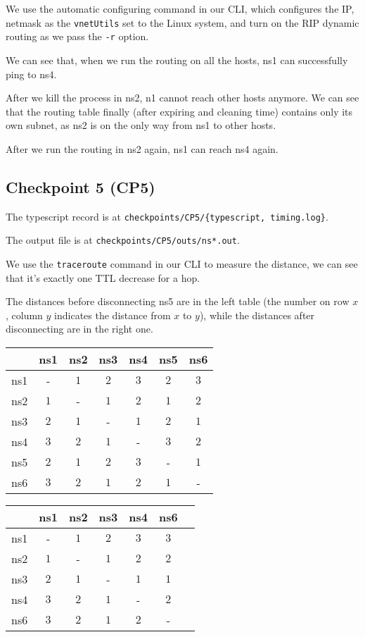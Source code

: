 \documentclass[a4paper]{article}
\begin{document}
  We use the automatic configuring command in our CLI, which configures the IP, netmask as the \texttt{vnetUtils} set to the Linux system, and turn on the RIP dynamic routing as we pass the \texttt{-r} option.

  We can see that, when we run the routing on all the hosts, ns1 can successfully ping to ns4.

  After we kill the process in ns2, n1 cannot reach other hosts anymore. We can see that the routing table finally (after expiring and cleaning time) contains only its own subnet, as ns2 is on the only way from ns1 to other hosts.

  After we run the routing in ns2 again, ns1 can reach ns4 again.

  \subsection{Checkpoint 5 (CP5)}

  The typescript record is at \texttt{checkpoints/CP5/\{typescript, timing.log\}}.

  The output file is at \texttt{checkpoints/CP5/outs/ns*.out}.

  We use the \texttt{traceroute} command in our CLI to measure the distance, we can see that it's exactly one TTL decrease for a hop.

  The distances before disconnecting ns5 are in the left table (the number on row $x$, column $y$ indicates the distance from $x$ to $y$), while the distances after disconnecting are in the right one.
  
  \begin{center}
    \begin{tabular}{c|cccccc}
      \toprule
      & ns1 & ns2 & ns3 & ns4 & ns5 & ns6 \\
      \midrule
      ns1 & - & $1$ & $2$ & $3$ & $2$ & $3$ \\
      ns2 & $1$ & - & $1$ & $2$ & $1$ & $2$ \\
      ns3 & $2$ & $1$ & - & $1$ & $2$ & $1$ \\
      ns4 & $3$ & $2$ & $1$ & - & $3$ & $2$ \\
      ns5 & $2$ & $1$ & $2$ & $3$ & - & $1$ \\
      ns6 & $3$ & $2$ & $1$ & $2$ & $1$ & - \\
      \bottomrule
    \end{tabular}
    \hspace{2em}
    \begin{tabular}{c|cccccc}
      \toprule
      & ns1 & ns2 & ns3 & ns4 & ns6 \\
      \midrule
      ns1 & - & $1$ & $2$ & $3$ & $3$ \\
      ns2 & $1$ & - & $1$ & $2$ & $2$ \\
      ns3 & $2$ & $1$ & - & $1$ & $1$ \\
      ns4 & $3$ & $2$ & $1$ & - & $2$ \\
      ns6 & $3$ & $2$ & $1$ & $2$ & - \\
      \bottomrule
    \end{tabular}
  \end{center}
\end{document}
